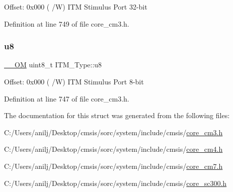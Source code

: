 Offset\+: 0x000 ( /W) I\+TM Stimulus Port 32-\/bit 

Definition at line 749 of file core\+\_\+cm3.\+h.

\mbox{\label{struct_i_t_m___type_ae773bf9f9dac64e6c28b14aa39f74275}} 
\subsubsection{\texorpdfstring{u8}{u8}}
{\footnotesize\ttfamily \hyperlink{core__sc300_8h_a0ea2009ed8fd9ef35b48708280fdb758}{\+\_\+\+\_\+\+OM} uint8\+\_\+t I\+T\+M\+\_\+\+Type\+::u8}

Offset\+: 0x000 ( /W) I\+TM Stimulus Port 8-\/bit 

Definition at line 747 of file core\+\_\+cm3.\+h.



The documentation for this struct was generated from the following files\+:\begin{DoxyCompactItemize}
\item 
C\+:/\+Users/anilj/\+Desktop/cmsis/sorc/system/include/cmsis/\hyperlink{core__cm3_8h}{core\+\_\+cm3.\+h}\item 
C\+:/\+Users/anilj/\+Desktop/cmsis/sorc/system/include/cmsis/\hyperlink{core__cm4_8h}{core\+\_\+cm4.\+h}\item 
C\+:/\+Users/anilj/\+Desktop/cmsis/sorc/system/include/cmsis/\hyperlink{core__cm7_8h}{core\+\_\+cm7.\+h}\item 
C\+:/\+Users/anilj/\+Desktop/cmsis/sorc/system/include/cmsis/\hyperlink{core__sc300_8h}{core\+\_\+sc300.\+h}\end{DoxyCompactItemize}
